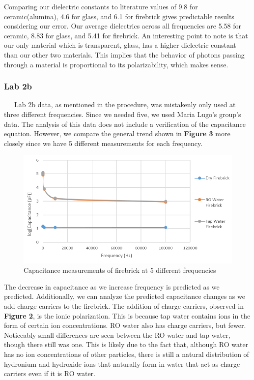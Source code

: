 \documentclass{article}
\begin{document}
Comparing our dielectric constants to literature values of 9.8 for ceramic(alumina), 4.6 for glass, and 6.1 for firebrick gives predictable results considering our error. Our average dielectrics across all frequencies are 5.58 for ceramic, 8.83 for glass, and 5.41 for firebrick. An interesting point to note is that our only material which is transparent, glass, has a higher dielectric constant than our other two materials. This implies that the behavior of photons passing through a material is proportional to its polarizability, which makes sense.

\subsubsection*{Lab 2b}
\ \ \ Lab 2b data, as mentioned in the procedure, was mistakenly only used at three different frequencies. Since we needed five, we used Maria Lugo's group's data. The analysis of this data does not include a verification of the capacitance equation. However, we compare the general trend shown in \textbf{Figure 3} more closely since we have 5 different measurements for each frequency.

\begin{figure}[h!]
	\centering
	\includegraphics[scale=0.775]{2b.png}
	\caption{Capacitance measurements of firebrick at 5 different frequencies}
\end{figure}

The decrease in capacitance as we increase frequency is predicted as we predicted. Additionally, we can analyze the predicted capacitance changes as we add charge carriers to the firebrick. The addition of charge carriers, observed in \textbf{Figure 2}, is the ionic polarization. This is because tap water contains ions in the form of certain ion concentrations. RO water also has charge carriers, but fewer. Noticeably small differences are seen between the RO water and tap water, though there still was one. This is likely due to the fact that, although RO water has no ion concentrations of other particles, there is still a natural distribution of hydronium and hydroxide ions that naturally form in water that act as charge carriers even if it is RO water.\\
\end{document}
